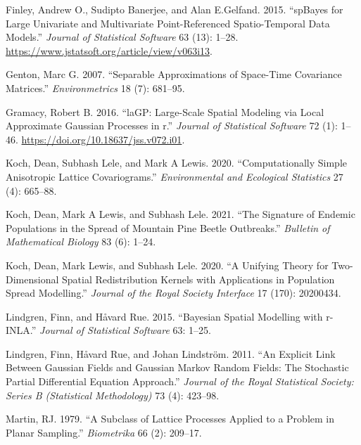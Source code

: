 \begin{CSLReferences}{1}{0}
\leavevmode{}%
Finley, Andrew O., Sudipto Banerjee, and Alan E.Gelfand. 2015. {``{spBayes} for Large Univariate and Multivariate Point-Referenced Spatio-Temporal Data Models.''} \emph{Journal of Statistical Software} 63 (13): 1--28. \url{https://www.jstatsoft.org/article/view/v063i13}.

\leavevmode{}%
Genton, Marc G. 2007. {``Separable Approximations of Space-Time Covariance Matrices.''} \emph{Environmetrics} 18 (7): 681--95.

\leavevmode{}%
Gramacy, Robert B. 2016. {``laGP: Large-Scale Spatial Modeling via Local Approximate Gaussian Processes in r.''} \emph{Journal of Statistical Software} 72 (1): 1--46. \url{https://doi.org/10.18637/jss.v072.i01}.

\leavevmode{}%
Koch, Dean, Subhash Lele, and Mark A Lewis. 2020. {``Computationally Simple Anisotropic Lattice Covariograms.''} \emph{Environmental and Ecological Statistics} 27 (4): 665--88.

\leavevmode{}%
Koch, Dean, Mark A Lewis, and Subhash Lele. 2021. {``The Signature of Endemic Populations in the Spread of Mountain Pine Beetle Outbreaks.''} \emph{Bulletin of Mathematical Biology} 83 (6): 1--24.

\leavevmode{}%
Koch, Dean, Mark Lewis, and Subhash Lele. 2020. {``A Unifying Theory for Two-Dimensional Spatial Redistribution Kernels with Applications in Population Spread Modelling.''} \emph{Journal of the Royal Society Interface} 17 (170): 20200434.

\leavevmode{}%
Lindgren, Finn, and Håvard Rue. 2015. {``Bayesian Spatial Modelling with r-INLA.''} \emph{Journal of Statistical Software} 63: 1--25.

\leavevmode{}%
Lindgren, Finn, Håvard Rue, and Johan Lindström. 2011. {``An Explicit Link Between Gaussian Fields and Gaussian Markov Random Fields: The Stochastic Partial Differential Equation Approach.''} \emph{Journal of the Royal Statistical Society: Series B (Statistical Methodology)} 73 (4): 423--98.

\leavevmode{}%
Martin, RJ. 1979. {``A Subclass of Lattice Processes Applied to a Problem in Planar Sampling.''} \emph{Biometrika} 66 (2): 209--17.


\end{CSLReferences}
